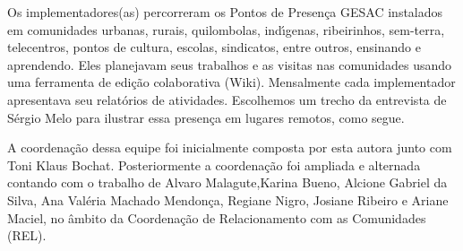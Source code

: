 \documentclass[
12pt,		%
openright,	%
twoside,  %
a4paper,			%
chapter=TITLE,		%
english,			%
french,				%
spanish,			%
brazil				%
]{USPSC-classe/USPSC}
\begin{document}
Os implementadores(as) percorreram os Pontos de Presen\c{c}a GESAC instalados em comunidades urbanas, rurais, quilombolas, ind\'{\i}genas, ribeirinhos, sem-terra, telecentros, pontos de cultura, escolas, sindicatos, entre outros, ensinando e aprendendo. Eles planejavam seus trabalhos e as visitas nas comunidades usando uma ferramenta de edi\c{c}\~ao colaborativa (Wiki). Mensalmente cada implementador apresentava seu relat\'orios de atividades. Escolhemos um trecho da entrevista de S\'ergio Melo para ilustrar essa presen\c{c}a em lugares remotos, como segue.


















\noindent\begin{center}\mbox{\centering{}}\end{center}


A coordena\c{c}\~ao dessa equipe foi inicialmente composta por esta autora junto com Toni Klaus Bochat. Posteriormente a coordena\c{c}\~ao foi ampliada e alternada contando com o trabalho de Alvaro Malagute,Karina Bueno, Alcione Gabriel da Silva, Ana Val\'eria Machado Mendon\c{c}a, Regiane Nigro, Josiane Ribeiro e Ariane Maciel, no \^ambito da Coordena\c{c}\~ao de  Relacionamento com as Comunidades (REL).
\end{document}
